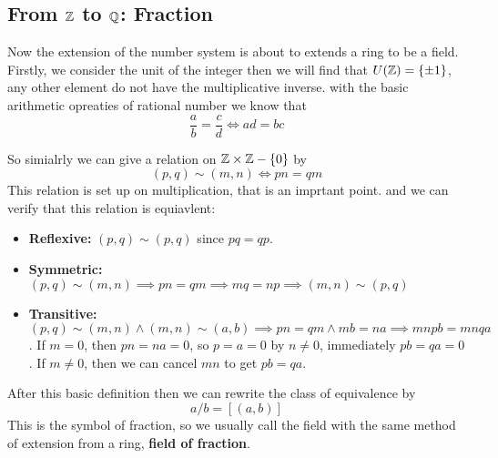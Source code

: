 \documentclass[en,geye,blue,pc,12pt]{elegantnote}
\begin{document}
\subsection{From \texorpdfstring{$\mathbb{Z}$}{TEXT} to \texorpdfstring{$\mathbb{Q}$}{TEXT}: Fraction}
Now the extension of the number system is about to extends a ring to be a field. Firstly, we consider the unit of the integer then we will find that \(U(\mathbb{Z}) = \{\pm 1\}\), any other element do not have the multiplicative inverse. with the basic arithmetic opreaties of rational number we know that 
\[\frac{a}{b} = \frac{c}{d} \iff ad = bc\]

So simialrly we can give a relation on \(\mathbb{Z} \times \mathbb{Z}-\{0\}\) by 
\[(p,q) \sim (m,n) \iff pn = qm\]
This relation is set up on multiplication, that is an imprtant point. and we can verify that this relation is equiavlent:
\begin{itemize}
  \item\textbf{ Reflexive:} \((p,q) \sim ({p,q})\) since  \(pq =qp\).
  \item \textbf{Symmetric:} \((p,q) \sim (m,n) \implies pn = qm \implies mq =np \implies (m,n) \sim (p,q)\)
  \item \textbf{Transitive:} \((p,q) \sim (m,n) \land (m,n) \sim (a,b) \implies  pn = qm \land mb = na \implies mnpb = mnqa\). If \(m =0\), then \(pn=na=0\), so \(p=a=0\) by \(n \neq 0\), immediately \(pb=qa=0 \). If \(m \neq 0\), then we can cancel \(mn\) to get \(pb = qa\).
\end{itemize}

After this basic definition then we can rewrite the class of equivalence by 
\[a/b = [(a,b)]\]
This is the symbol of fraction, so we usually call the field with the same method of extension from a ring, \textbf{field of fraction}. 
\end{document}
